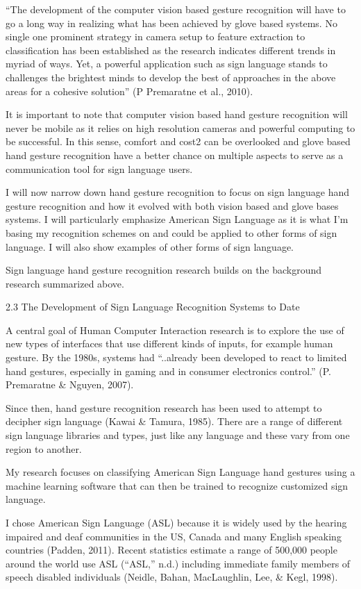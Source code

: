 ``The development of the computer vision based gesture recognition will have to go a long way in realizing what has been achieved by glove based systems. No single one prominent strategy in camera setup to feature extraction to classification has been established as the research indicates different trends in myriad of ways. Yet, a powerful application such as sign language stands to challenges the brightest minds to develop the best of approaches in the above areas for a cohesive solution'' (P Premaratne et al., 2010). 

It is important to note that computer vision based hand gesture recognition will never be mobile as it relies on high resolution cameras and powerful computing to be successful. In this sense, comfort and cost2 can be overlooked and glove based hand gesture recognition have a better chance on multiple aspects to serve as a communication tool for sign language users. 

I will now narrow down hand gesture recognition to focus on sign language hand gesture recognition and how it evolved with both vision based and glove bases systems. I will particularly emphasize American Sign Language as it is what I’m basing my recognition schemes on and could be applied to other forms of sign language. I will also show examples of other forms of sign language. 

Sign language hand gesture recognition research builds on the background research summarized above. 


2.3 The Development of Sign Language Recognition Systems to Date

A central goal of Human Computer Interaction research is to explore the use of new types of interfaces that use different kinds of inputs, for example human gesture. By the 1980s, systems had ``..already been developed to react to limited hand gestures, especially in gaming and in consumer electronics control.'' (P. Premaratne & Nguyen, 2007).

Since then, hand gesture recognition research has been used to attempt to decipher sign language (Kawai & Tamura, 1985). There are a range of different sign language libraries and types, just like any language and these vary from one region to another.

My research focuses on classifying American Sign Language hand gestures using a machine learning software that can then be trained to recognize customized sign language. 

I chose American Sign Language (ASL) because it is widely used by the hearing impaired and deaf communities in the US, Canada and many English speaking countries (Padden, 2011). Recent statistics estimate a range of 500,000 people around the world use ASL (``ASL,'' n.d.) including immediate family members of speech disabled individuals (Neidle, Bahan, MacLaughlin, Lee, & Kegl, 1998).

